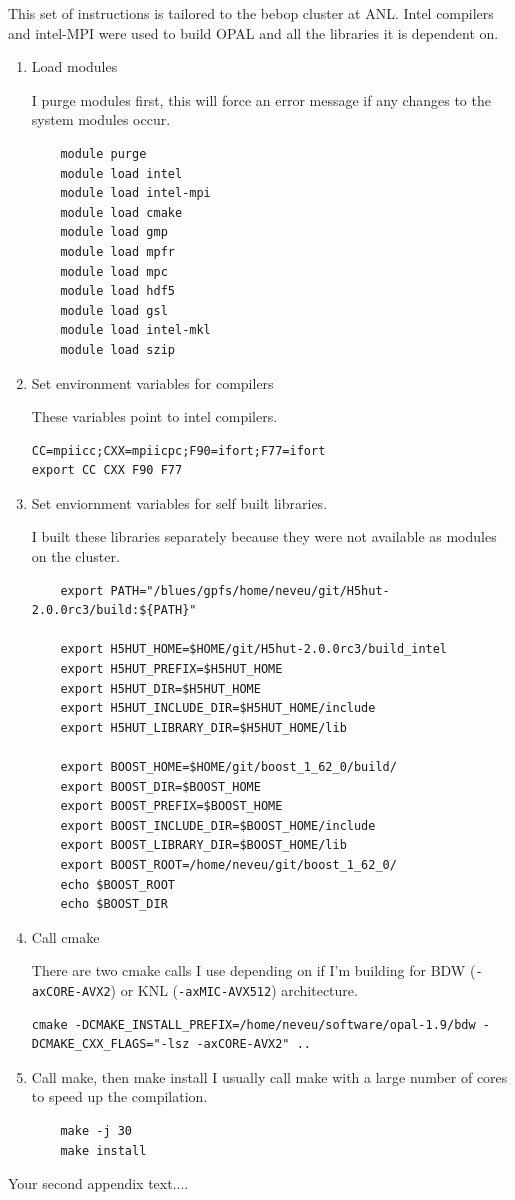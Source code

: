 \documentclass{iitthesis}
\begin{document}
 \label{build}
This set of instructions is tailored to the bebop cluster at ANL. 
Intel compilers and intel-MPI were used to build OPAL and all 
the libraries it is dependent on.
\begin{enumerate}[label=Step \arabic*:]
	\item Load modules 

I purge modules first, this will force an error message if any changes
to the system modules occur.
\begin{lstlisting}
	module purge
	module load intel
	module load intel-mpi 
	module load cmake 
	module load gmp   
	module load mpfr  
	module load mpc   
	module load hdf5   
	module load gsl   
	module load intel-mkl
	module load szip
\end{lstlisting}

    \item Set environment variables for compilers 
 
These variables point to intel compilers. 
\begin{lstlisting}
CC=mpiicc;CXX=mpiicpc;F90=ifort;F77=ifort
export CC CXX F90 F77
\end{lstlisting}

    \item Set enviornment variables for self built libraries.
    
I built these libraries separately because they were not available as 
modules on the cluster. 

\begin{lstlisting}
	export PATH="/blues/gpfs/home/neveu/git/H5hut-2.0.0rc3/build:${PATH}"
	
	export H5HUT_HOME=$HOME/git/H5hut-2.0.0rc3/build_intel
	export H5HUT_PREFIX=$H5HUT_HOME
	export H5HUT_DIR=$H5HUT_HOME
	export H5HUT_INCLUDE_DIR=$H5HUT_HOME/include
	export H5HUT_LIBRARY_DIR=$H5HUT_HOME/lib
	
	export BOOST_HOME=$HOME/git/boost_1_62_0/build/
	export BOOST_DIR=$BOOST_HOME
	export BOOST_PREFIX=$BOOST_HOME
	export BOOST_INCLUDE_DIR=$BOOST_HOME/include
	export BOOST_LIBRARY_DIR=$BOOST_HOME/lib
	export BOOST_ROOT=/home/neveu/git/boost_1_62_0/
	echo $BOOST_ROOT
	echo $BOOST_DIR
\end{lstlisting}

    \item Call cmake 
    
There are two cmake calls I use depending on if I'm building for 
BDW (\verb|-axCORE-AVX2|) or KNL (\verb|-axMIC-AVX512|) architecture. 
    
\begin{lstlisting}
cmake -DCMAKE_INSTALL_PREFIX=/home/neveu/software/opal-1.9/bdw -DCMAKE_CXX_FLAGS="-lsz -axCORE-AVX2" ..
\end{lstlisting}

    \item Call make, then make install
I usually call make with a large number of cores to speed up the compilation.    
\begin{lstlisting}
	make -j 30 
	make install
\end{lstlisting}

\end{enumerate}





Your second appendix text....

\newpage
%
%


\end{document}
